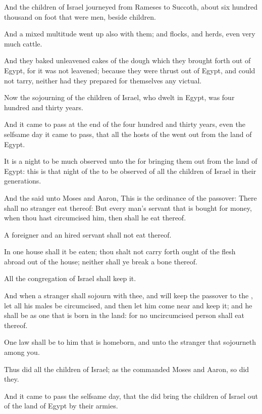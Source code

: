 \verse And the children of Israel journeyed from Rameses to Succoth,
about six hundred thousand on foot that were men, beside children.

\verse And a mixed multitude went up also with them; and flocks, and
herds, even very much cattle.

\verse And they baked unleavened cakes of the dough which they brought
forth out of Egypt, for it was not leavened; because they were thrust
out of Egypt, and could not tarry, neither had they prepared for
themselves any victual.

\verse Now the sojourning of the children of Israel, who dwelt in
Egypt, was four hundred and thirty years.

\verse And it came to pass at the end of the four hundred and thirty
years, even the selfsame day it came to pass, that all the hosts of
the \LORD went out from the land of Egypt.

\verse It is a night to be much observed unto the \LORD for bringing
them out from the land of Egypt: this is that night of the \LORD to be
observed of all the children of Israel in their generations.

\verse And the \LORD said unto Moses and Aaron, This is the ordinance of
the passover: There shall no stranger eat thereof: \verse But every
man's servant that is bought for money, when thou hast circumcised
him, then shall he eat thereof.

\verse A foreigner and an hired servant shall not eat thereof.

\verse In one house shall it be eaten; thou shalt not carry forth ought
of the flesh abroad out of the house; neither shall ye break a bone
thereof.

\verse All the congregation of Israel shall keep it.

\verse And when a stranger shall sojourn with thee, and will keep the
passover to the \LORD, let all his males be circumcised, and then let
him come near and keep it; and he shall be as one that is born in the
land: for no uncircumcised person shall eat thereof.

\verse One law shall be to him that is homeborn, and unto the stranger
that sojourneth among you.

\verse Thus did all the children of Israel; as the \LORD commanded Moses
and Aaron, so did they.

\verse And it came to pass the selfsame day, that the \LORD did bring
the children of Israel out of the land of Egypt by their armies.

